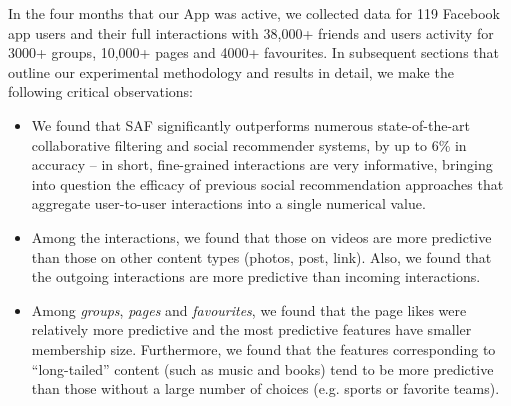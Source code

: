 In the four months that our App was active, we collected data for  
119 Facebook app users and their full interactions with 38,000+ friends
and users activity for 3000+ groups, 10,000+ pages and 4000+ favourites. 
In subsequent sections that outline our experimental methodology and results in detail, 
we make the following critical observations:
\begin{itemize}
\item We found that SAF significantly 
outperforms numerous state-of-the-art collaborative filtering and social recommender 
systems, by up to 6\% in accuracy -- in short, fine-grained 
interactions are very informative, bringing into question the efficacy of 
previous social recommendation approaches that aggregate user-to-user interactions into 
a single numerical value.


\item Among the interactions, we found that those on videos are more predictive than
 those on other content types (photos, post, link). Also, we found that the outgoing
 interactions are more predictive than incoming interactions.
\item %
Among {\em groups}, {\em pages} and {\em favourites}, we found that the page likes were
relatively more predictive and the most predictive features have smaller membership size. 
Furthermore, we found that the features corresponding to ``long-tailed'' content (such as music and books)
tend to be more predictive than those without a large number of choices 
(e.g. sports or favorite teams). 
\end{itemize}

